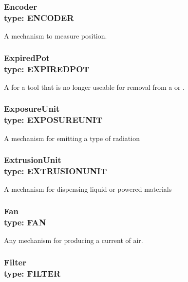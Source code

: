 \subsubsection[Encoder]{Encoder \\ {\small type: ENCODER}}
\label{sec:Encoder}



A mechanism to measure position.


\subsubsection[ExpiredPot]{ExpiredPot \\ {\small type: EXPIRED\textunderscore POT}}
\label{sec:ExpiredPot}



A  for a tool that is no longer useable for removal from a  or .


\subsubsection[ExposureUnit]{ExposureUnit \\ {\small type: EXPOSURE\textunderscore UNIT}}
\label{sec:ExposureUnit}



A mechanism for emitting a type of radiation


\subsubsection[ExtrusionUnit]{ExtrusionUnit \\ {\small type: EXTRUSION\textunderscore UNIT}}
\label{sec:ExtrusionUnit}



A mechanism for dispensing liquid or powered materials


\subsubsection[Fan]{Fan \\ {\small type: FAN}}
\label{sec:Fan}



Any mechanism for producing a current of air.


\subsubsection[Filter]{Filter \\ {\small type: FILTER}}
\label{sec:Filter}



